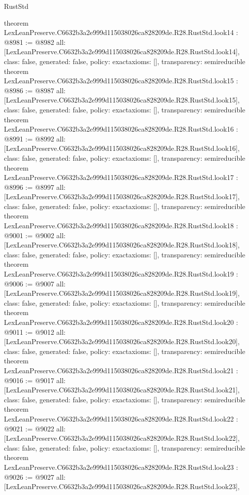 \begin{lexlean}{RustStd}
\begin{coremodule}
{}
theorem LexLeanPreserve.C6632b3a2e999d115038026ca828209de.R28.RustStd.look14 : @8981 := @8982 {
  all: [LexLeanPreserve.C6632b3a2e999d115038026ca828209de.R28.RustStd.look14],
  class: false,
  generated: false,
  policy: exact{axioms: []},
  transparency: semireducible
}
theorem LexLeanPreserve.C6632b3a2e999d115038026ca828209de.R28.RustStd.look15 : @8986 := @8987 {
  all: [LexLeanPreserve.C6632b3a2e999d115038026ca828209de.R28.RustStd.look15],
  class: false,
  generated: false,
  policy: exact{axioms: []},
  transparency: semireducible
}
theorem LexLeanPreserve.C6632b3a2e999d115038026ca828209de.R28.RustStd.look16 : @8991 := @8992 {
  all: [LexLeanPreserve.C6632b3a2e999d115038026ca828209de.R28.RustStd.look16],
  class: false,
  generated: false,
  policy: exact{axioms: []},
  transparency: semireducible
}
theorem LexLeanPreserve.C6632b3a2e999d115038026ca828209de.R28.RustStd.look17 : @8996 := @8997 {
  all: [LexLeanPreserve.C6632b3a2e999d115038026ca828209de.R28.RustStd.look17],
  class: false,
  generated: false,
  policy: exact{axioms: []},
  transparency: semireducible
}
theorem LexLeanPreserve.C6632b3a2e999d115038026ca828209de.R28.RustStd.look18 : @9001 := @9002 {
  all: [LexLeanPreserve.C6632b3a2e999d115038026ca828209de.R28.RustStd.look18],
  class: false,
  generated: false,
  policy: exact{axioms: []},
  transparency: semireducible
}
theorem LexLeanPreserve.C6632b3a2e999d115038026ca828209de.R28.RustStd.look19 : @9006 := @9007 {
  all: [LexLeanPreserve.C6632b3a2e999d115038026ca828209de.R28.RustStd.look19],
  class: false,
  generated: false,
  policy: exact{axioms: []},
  transparency: semireducible
}
theorem LexLeanPreserve.C6632b3a2e999d115038026ca828209de.R28.RustStd.look20 : @9011 := @9012 {
  all: [LexLeanPreserve.C6632b3a2e999d115038026ca828209de.R28.RustStd.look20],
  class: false,
  generated: false,
  policy: exact{axioms: []},
  transparency: semireducible
}
theorem LexLeanPreserve.C6632b3a2e999d115038026ca828209de.R28.RustStd.look21 : @9016 := @9017 {
  all: [LexLeanPreserve.C6632b3a2e999d115038026ca828209de.R28.RustStd.look21],
  class: false,
  generated: false,
  policy: exact{axioms: []},
  transparency: semireducible
}
theorem LexLeanPreserve.C6632b3a2e999d115038026ca828209de.R28.RustStd.look22 : @9021 := @9022 {
  all: [LexLeanPreserve.C6632b3a2e999d115038026ca828209de.R28.RustStd.look22],
  class: false,
  generated: false,
  policy: exact{axioms: []},
  transparency: semireducible
}
theorem LexLeanPreserve.C6632b3a2e999d115038026ca828209de.R28.RustStd.look23 : @9026 := @9027 {
  all: [LexLeanPreserve.C6632b3a2e999d115038026ca828209de.R28.RustStd.look23],
}
\end{coremodule}
\end{lexlean}
